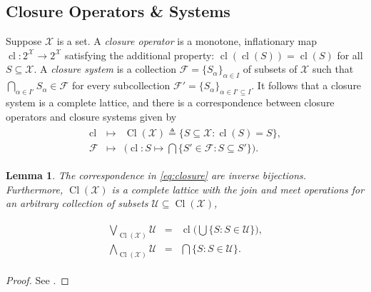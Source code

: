 \documentclass[conference]{ieeeconf}
\newcommand{\powerset}[1]{2^{#1}}
\newcommand{\X}{\mathcal{X}}
\newcommand{\F}{\mathcal{F}}
\newcommand{\U}{\mathcal{U}}
\newcommand{\bigjoin}{\bigvee}
\newcommand{\bigmeet}{\bigwedge}
\DeclareMathOperator{\cl}{cl}
\DeclareMathOperator{\Cl}{Cl}
\newtheorem{lemma}{Lemma}
\begin{document}
\vspace{-0.5em}
\appendix

\vspace{-0.25em}
\subsection{Closure Operators \& Systems}
\vspace{-0.25em}

Suppose $\X$ is a set. A \emph{closure operator} is a monotone, inflationary map $\cl: \powerset{\X} \to \powerset{\X}$ satisfying the additional property: $\cl(\cl(S)) = \cl(S)$ for all $S \subseteq \X$. A \emph{closure system} is a collection $\F = \{S_{\alpha}\}_{\alpha \in I}$ of subsets of $\X$ such that $\bigcap_{\alpha \in I'} S_{\alpha} \in \F$ for every subcollection $\F' = \{S_{\alpha}\}_{\alpha \in I' \subseteq I}$. It follows that a closure system is a complete lattice, and there is a correspondence between closure operators and closure systems given by
\begin{align}
\begin{aligned}
    \cl &\mapsto& \Cl(\X) \triangleq \{ S \subseteq \X : \cl(S)=S \}, \\
          \F &\mapsto& \biggl( \cl: S \mapsto \bigcap  \{ S' \in \F : S \subseteq S' \} \biggr).
\end{aligned} \label{eq:closure}
\end{align}

\begin{lemma} \label{lem:joins-closure}
   The correspondence in \eqref{eq:closure} are inverse bijections. Furthermore, $\Cl(\X)$ is a complete lattice with the join and meet operations for an arbitrary collection of subsets $\U \subseteq \Cl(\X)$,
\end{lemma}
   \begin{align}
   \begin{aligned}
       \bigjoin_{\Cl(\X)} \U &=& \cl \biggl( \bigcup \{S: S \in \U\} \biggr), \\
       \bigmeet_{\Cl(\X)} \U &=& \bigcap \{S: S \in \U\}.
   \end{aligned} \label{eq:joins-closure}
   \end{align}
   
\begin{proof}
    See \cite[Theorem 3.7-3.8]{roman2008}.
\end{proof}
\end{document}
